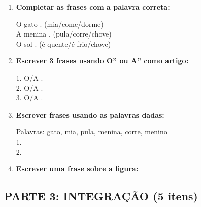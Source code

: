 \begin{exercicio}
\begin{enumerate}[resume]
  \item \textbf{Completar as frases com a palavra correta:}
  \begin{center}
  O gato \underline{\hspace{2cm}}. (mia/come/dorme) \\
  A menina \underline{\hspace{2cm}}. (pula/corre/chove) \\
  O sol \underline{\hspace{2cm}}. (é quente/é frio/chove)
  \end{center}

  \item \textbf{Escrever 3 frases usando O'' ou A'' como artigo:}
  \begin{center}
  1. O/A \underline{\hspace{4cm}}. \\
  2. O/A \underline{\hspace{4cm}}. \\
  3. O/A \underline{\hspace{4cm}}.
  \end{center}

  \item \textbf{Escrever frases usando as palavras dadas:}
  \begin{center}
  Palavras: gato, mia, pula, menina, corre, menino \\
  1. \underline{\hspace{8cm}} \\
  2. \underline{\hspace{8cm}}
  \end{center}

  \item \textbf{Escrever uma frase sobre a figura:}
  \begin{center}
  \end{center}
  \begin{center}
  \underline{\hspace{10cm}}
  \end{center}
\end{enumerate}

\subsection*{PARTE 3: INTEGRAÇÃO (5 itens)}


\end{exercicio}

